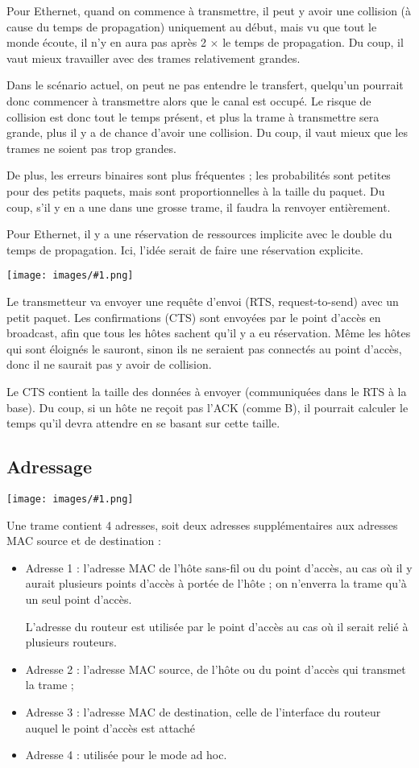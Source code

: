 \documentclass[10pt,a4paper]{report}
\newcommand{\dessin}[1]{\begin{center}\texttt{[image: images/\#1.png]}\end{center}}
\begin{document}
		Pour Ethernet, quand on commence à transmettre, il peut y avoir une collision (à cause du temps de propagation) uniquement au début, mais vu que tout le monde écoute, il n'y en aura pas après 2 $\times$ le temps de propagation. Du coup, il vaut mieux travailler avec des trames relativement grandes.
		
		Dans le scénario actuel, on peut ne pas entendre le transfert, quelqu'un pourrait donc commencer à transmettre alors que le canal est occupé. Le risque de collision est donc tout le temps présent, et plus la trame à transmettre sera grande, plus il y a de chance d'avoir une collision. Du coup, il vaut mieux que les trames ne soient pas trop grandes.
		
		De plus, les erreurs binaires sont plus fréquentes ; les probabilités sont petites pour des petits paquets, mais sont proportionnelles à la taille du paquet. Du coup, s'il y en a une dans une grosse trame, il faudra la renvoyer entièrement.
		
		Pour Ethernet, il y a une réservation de ressources implicite avec le double du temps de propagation. Ici, l'idée serait de faire une réservation explicite. 
		
		\dessin{37}
		
		Le transmetteur va envoyer une requête d'envoi (RTS, request-to-send) avec un petit paquet. Les confirmations (CTS) sont envoyées par le point d'accès en broadcast, afin que tous les hôtes sachent qu'il y a eu réservation. Même les hôtes qui sont éloignés le sauront, sinon ils ne seraient pas connectés au point d'accès, donc il ne saurait pas y avoir de collision.
		
		Le CTS contient la taille des données à envoyer (communiquées dans le RTS à la base). Du coup, si un hôte ne reçoit pas l'ACK (comme B), il pourrait calculer le temps qu'il devra attendre en se basant sur cette taille.
		
		\subsection{Adressage}
		
		\dessin{41}
		
		Une trame contient 4 adresses, soit deux adresses supplémentaires aux adresses MAC source et de destination :
		
		\begin{itemize}
			\item Adresse 1 : l'adresse MAC de l'hôte sans-fil ou du point d'accès, au cas où il y aurait plusieurs points d'accès à portée de l'hôte ; on n'enverra la trame qu'à un seul point d'accès. 
						
			 L'adresse du routeur est utilisée par le point d'accès au cas où il serait relié à plusieurs routeurs.
			\item Adresse 2 : l'adresse MAC source, de l'hôte ou du point d'accès qui transmet la trame ;
			\item Adresse 3 : l'adresse MAC de destination, celle de l'interface du routeur auquel le point d'accès est attaché
			\item Adresse 4 : utilisée pour le mode ad hoc.
		\end{itemize}
		
\end{document}
